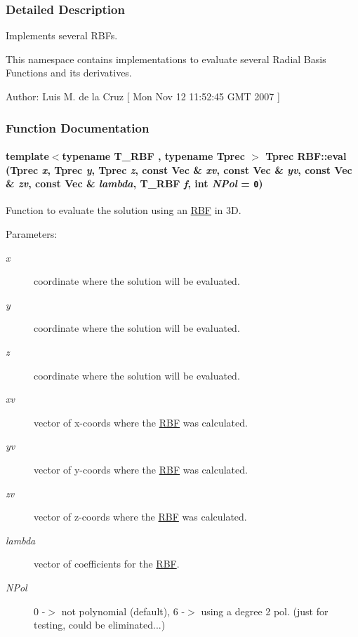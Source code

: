 \subsubsection{Detailed Description}
Implements several RBFs. 

This namespace contains implementations to evaluate several Radial Basis Functions and its derivatives. \begin{Desc}
\item[Author:]Luis M. de la Cruz \mbox{[} Mon Nov 12 11:52:45 GMT 2007 \mbox{]} \end{Desc}




\subsubsection{Function Documentation}
\hypertarget{namespaceRBF_27e582398e80f1f030b0c98b8ced1619}{
\paragraph[{eval}]{\setlength{\rightskip}{0pt plus 5cm}template$<$typename T\_\-RBF , typename Tprec $>$ Tprec RBF::eval (Tprec {\em x}, \/  Tprec {\em y}, \/  Tprec {\em z}, \/  const {\bf Vec} \& {\em xv}, \/  const {\bf Vec} \& {\em yv}, \/  const {\bf Vec} \& {\em zv}, \/  const {\bf Vec} \& {\em lambda}, \/  T\_\-RBF {\em f}, \/  int {\em NPol} = {\tt 0})}\hfill}
\label{namespaceRBF_27e582398e80f1f030b0c98b8ced1619}


Function to evaluate the solution using an \hyperlink{namespaceRBF}{RBF} in 3D. 

\begin{Desc}
\item[Parameters:]
\begin{description}
\item[{\em x}]coordinate where the solution will be evaluated. \item[{\em y}]coordinate where the solution will be evaluated. \item[{\em z}]coordinate where the solution will be evaluated. \item[{\em xv}]vector of x-coords where the \hyperlink{namespaceRBF}{RBF} was calculated. \item[{\em yv}]vector of y-coords where the \hyperlink{namespaceRBF}{RBF} was calculated. \item[{\em zv}]vector of z-coords where the \hyperlink{namespaceRBF}{RBF} was calculated. \item[{\em lambda}]vector of coefficients for the \hyperlink{namespaceRBF}{RBF}. \item[{\em NPol}]0 -$>$ not polynomial (default), 6 -$>$ using a degree 2 pol. (just for testing, could be eliminated...) \end{description}
\end{Desc}


